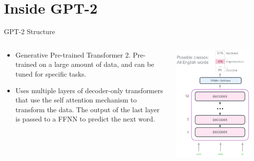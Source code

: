 \documentclass{beamer}
\begin{document}
\section{Inside GPT-2}

\begin{frame}{GPT-2 Structure}

\begin{columns}
\begin{column}{0.5\textwidth}
  \begin{itemize}

    \item<1-> Generative Pre-trained Transformer 2. Pre-trained on a large amount of data, and can be tuned for specific tasks. 
    
    \item<2-> Uses multiple layers of decoder-only transformers that use the self attention mechanism to transform the data. The output of the last layer is passed to a FFNN to predict the next word. 
\end{itemize}
\end{column}
\begin{column}{0.5\textwidth}  %
    \begin{center}
         \includegraphics[width=1\textwidth]{gpt2.png}
     \end{center}
\end{column}
\end{columns}



\end{frame}
\end{document}
